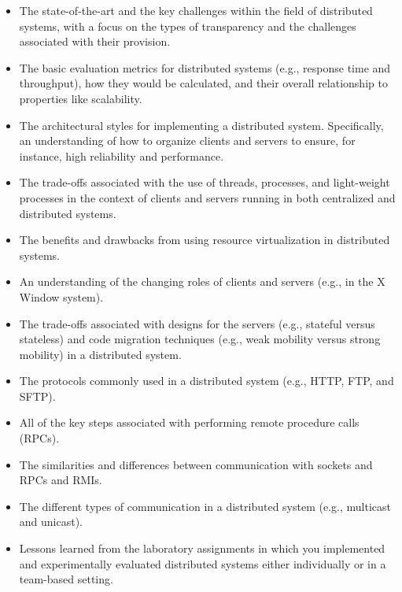 \vspace*{-.05in}
\begin{itemize}

  \itemsep 0in

  \item The state-of-the-art and the key challenges within the field of distributed systems, with a focus on the types
    of transparency and the challenges associated with their provision.

  \item The basic evaluation metrics for distributed systems (e.g., response time and throughput), how they would be
    calculated, and their overall relationship to properties like scalability.

  \item The architectural styles for implementing a distributed system. Specifically, an understanding of how to
    organize clients and servers to ensure, for instance, high reliability and performance.

  \item The trade-offs associated with the use of threads, processes, and light-weight processes in the context of
    clients and servers running in both centralized and distributed systems.

  \item The benefits and drawbacks from using resource virtualization in distributed systems.

  \item An understanding of the changing roles of clients and servers (e.g., in the X Window system).

  \item The trade-offs associated with designs for the servers (e.g., stateful versus stateless) and code migration
    techniques (e.g., weak mobility versus strong mobility) in a distributed system.

  \item The protocols commonly used in a distributed system (e.g., HTTP, FTP, and SFTP).

  \item All of the key steps associated with performing remote procedure calls (RPCs).

  \item The similarities and differences between communication with sockets and RPCs and RMIs.

  \item The different types of communication in a distributed system (e.g., multicast and unicast).

  \item Lessons learned from the laboratory assignments in which you implemented and experimentally evaluated
    distributed systems either individually or in a team-based setting.

\end{itemize}

